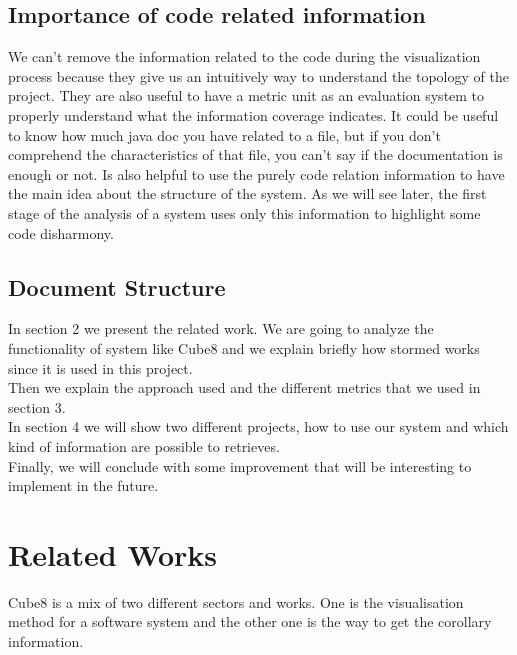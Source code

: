 \documentclass[]{usiinfbachelorproject}
\begin{document}
\subsection{Importance of code related information} 
We can't remove the information related to the code during the visualization process because they give us an intuitively way to understand the topology of the project. They are also useful to have a metric unit as an evaluation system to properly understand what the information coverage indicates.
It could be useful to know how much java doc you have related to a file, but if you don't comprehend the characteristics of that file, you can't say if the documentation is enough or not. Is also helpful to use the purely code relation information to have the main idea about the structure of the system. As we will see later, the first stage of the analysis of a system uses only this information to highlight some code disharmony.

\subsection{Document Structure} 
In section 2 we present the related work. We are going to analyze the functionality of system like Cube8 and we explain briefly how stormed works since it is used in this project.\\ Then we explain the approach used and the different metrics that we used in section 3.\\ In section 4 we will show two different projects, how to use our system and which kind of information are possible to retrieves.\\ Finally, we will conclude with some improvement that will be interesting to implement in the future.


\newpage


  
\section{Related Works} \label{related works}
Cube8 is a mix of two different sectors and works. One is the visualisation method for a software system and the other one is the way to get the corollary information.\\
\end{document}
